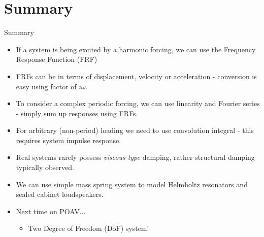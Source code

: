 \documentclass[11pt,aspectratio=169,handout]{beamer}
\begin{document}
\section{Summary}
\begin{frame}[c]{Summary}
	\begin{itemize}
	\item<1-> If a system is being excited by a harmonic forcing, we can use the Frequency Response Function (FRF)
	\item<2-> FRFs can be in terms of displacement, velocity or acceleration - conversion is easy using factor of $i\omega$.
	\item<3-> To consider a complex periodic forcing, we can use linearity and Fourier series - simply sum up responses using FRFs.
	\item<4-> For arbitrary (non-period) loading we need to use convolution integral - this requires system impulse response.
	\item<5-> Real systems rarely possess \textit{viscous type} damping, rather structural damping typically observed. 
	\item<6->  We can use simple mass spring system to model Helmholtz resonators and sealed cabinet loudspeakers. \\[0.5cm]
	\item<7-> Next time on POAV...
	\begin{itemize}
		\item[-]  Two Degree of Freedom (DoF) system!
	\end{itemize}
\end{itemize}
\end{frame}
\end{document}

